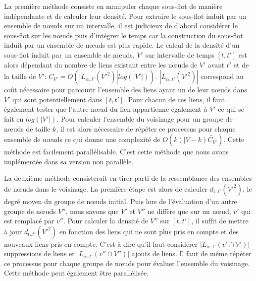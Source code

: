 La première méthode consiste en manipuler chaque sous-flot de manière indépendante et de calculer leur densité.
Pour extraire le sous-flot induit par un ensemble de n\oe uds sur un intervalle,
il est judicieux de d'abord considérer le sous-flot sur les n\oe uds puis d'intégrer le temps  car la construction du sous-flot induit par un ensemble de n\oe uds est plus rapide.
Le calcul de la densité d'un sous-flot induit par un ensemble de n\oe uds, $V'$ sur intervalle de temps $[t,t']$ est alors dépendant du nombre de liens existant entre les n\oe uds de $V'$ avant $t'$ et de la taille de $V'$: $C_{V'}=O(|L_{\alpha..t'}(V'^2)|log(|V'|))$.
$|L_{\alpha..t'}(V'^2)|$ correspond au coût nécessaire pour parcourir l'ensemble des liens ayant un de leur n\oe uds dans $V'$  qui sont potentiellement dans $[t,t']$.
Pour chacun de ces liens, il faut également tester que l'autre n\oe ud du lien appartienne également à $V'$ ce qui se fait en $log(|V'|)$.
Pour calculer l'ensemble du voisinage pour un groupe de n\oe uds de taille $k$, il est alors nécessaire de répéter ce processus pour chaque ensemble de n\oe uds ce qui donne une complexité de $O(k(|V-k) \tilde{C_{V'}})$.
Cette méthode est facilement parallélisable.
C'est cette méthode que nous avons implémentée dans sa version non parallèle.

La deuxième méthode consisterait en tirer parti de la ressemblance des ensembles de n\oe uds dans le voisinage.
La première étape est alors de calculer $d_{t..t'}(V'^2)$, le degré moyen du groupe de n\oe uds initial.
Puis lors de l'évaluation d'un autre groupe de n\oe uds $V''$, nous savons que $V'$ et $V''$ ne diffère que sur un n\oe ud, $v'$ qui est remplacé par $v''$.
Pour calculer la densité de $V''$ sur $[t,t']$, il suffit de mettre à jour $d_{t..t'}(V'^2)$ en fonction des liens qui ne sont plus pris en compte et des nouveaux liens pris en compte.
C'est à dire qu'il faut considérer $|L_{\alpha..t'}({v'} \cap V')|$ suppressions de liens et  $|L_{\alpha..t'}({v''} \cap V'')|$ ajouts de liens.
Il faut de même répéter ce processus pour chaque groupe de n\oe uds pour évaluer l'ensemble du voisinage.
Cette méthode peut également être parallélisée.


